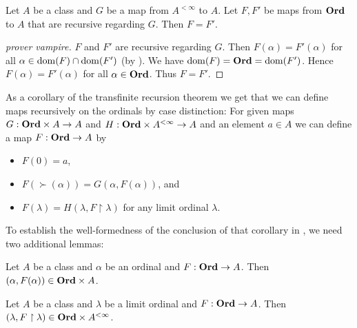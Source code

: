 \documentclass{article}
\begin{document}
  \begin{forthel}
    \begin{theorem*}\label{recursion_uniqueness}
      Let $A$ be a class and $G$ be a map from $A^{< \infty}$ to $A$.
      Let $F, F'$ be maps from $\textbf{Ord}$ to $A$ that are recursive regarding $G$.
      Then $F = F'$.
    \end{theorem*}
    \begin{proof}
      [prover vampire]
      $F$ and $F'$ are recursive regarding $G$.
      Then $F(\alpha) = F'(\alpha)$ for all $\alpha \in \operatorname{dom}(F) \cap \operatorname{dom}(F')$ (by ).
      We have $\operatorname{dom}(F) = \textbf{Ord} = \operatorname{dom}(F')$.
      Hence $F(\alpha) = F'(\alpha)$ for all $\alpha \in \textbf{Ord}$.
      Thus $F = F'$.
    \end{proof}
  \end{forthel}

  As a corollary of the transfinite recursion theorem we get that we can
  define maps recursively on the ordinals by case distinction:
  For given maps $G : \textbf{Ord} \times A \to A$ and
  $H : \textbf{Ord} \times A^{< \infty} \to A$ and an element $a \in A$ we can define
  a map $F : \textbf{Ord} \to A$ by
  \begin{itemize}
    \item $F(0) = a$,
    \item $F(\succ(\alpha)) = G(\alpha, F(\alpha))$, and
    \item $F(\lambda) = H(\lambda, F \restriction \lambda)$
      for any limit ordinal $\lambda$.
  \end{itemize}

  To establish the well-formedness of the conclusion of that corollary in
  \linebreak
  \Naproche, we need two additional lemmas:

  \begin{forthel}
    \begin{lemma*}
      Let $A$ be a class and $\alpha$ be an ordinal and $F : \textbf{Ord} \to A$.
      Then $(\alpha, F(\alpha)) \in \textbf{Ord} \times A$.
    \end{lemma*}

    \begin{lemma*}
      Let $A$ be a class and $\lambda$ be a limit ordinal and $F : \textbf{Ord} \to A$.
      Then $(\lambda, F \restriction \lambda) \in \textbf{Ord} \times A^{< \infty}$.
    \end{lemma*}
  \end{forthel}
\end{document}
